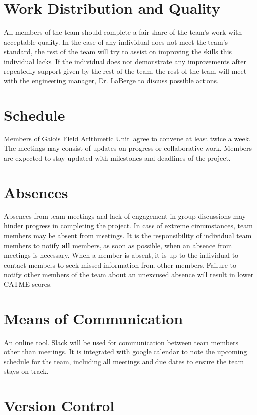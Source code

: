 \documentclass[paper=usletter, fontsize=12pt]{article}
\newcommand{\team}{Galois Field Arithmetic Unit}
\begin{document}
    \section{Work Distribution and Quality}
    All members of the team should complete a fair share of the team’s work with acceptable quality. In the case of any individual does not meet the team’s standard, the rest of the team will try to assist on improving the skills this individual lacks. If the individual does not demonstrate any improvements after repeatedly support given by the rest of the team, the rest of the team will meet with the engineering manager, Dr. LaBerge to discuss possible actions.     

    \section{Schedule}

        Members of \team \ agree to convene at least twice a week. The meetings may consist of updates on progress or collaborative work. Members are expected to stay updated with milestones and deadlines of the project.

    \section{Absences}

        Absences from team meetings and lack of engagement in group discussions may hinder progress in completing the project. In case of extreme circumstances, team members may be absent from meetings. It is the responsibility of individual team members to notify \textbf{all} members, as soon as possible, when an absence from meetings is necessary. When a member is absent, it is up to the individual to contact members to seek missed information from other members. Failure to notify other members of the team about an unexcused absence will result in lower CATME scores.

    \section{Means of Communication} 
    An online tool, Slack will be used for communication between team members other than meetings. It is integrated with google calendar to note the upcoming schedule for the team, including all meetings and due dates to ensure the team stays on track.  

    \section{Version Control}
\end{document}
